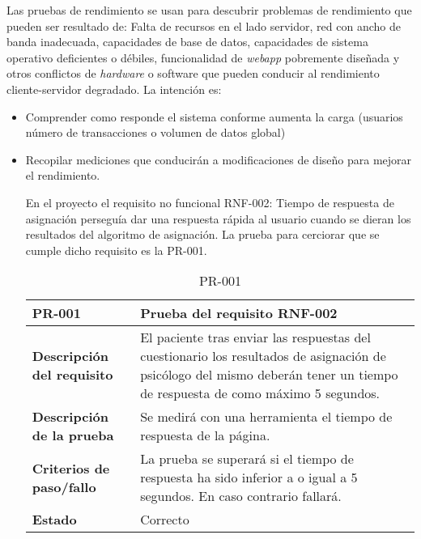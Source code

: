 Las pruebas de rendimiento se usan para descubrir problemas de rendimiento que pueden ser resultado de: Falta de recursos en el lado servidor, red con ancho de banda inadecuada, capacidades de base de datos, capacidades de sistema operativo deficientes o débiles, funcionalidad de \textit{webapp} pobremente diseñada y otros conflictos de \textit{hardware} o software que pueden conducir al rendimiento cliente-servidor degradado. La intención es: 


\begin{itemize}
\item Comprender como responde el sistema conforme aumenta la carga (usuarios número de transacciones o volumen de datos global) 
\item Recopilar mediciones que conducirán a modificaciones de diseño para mejorar el rendimiento.


En el proyecto el requisito no funcional RNF-002: Tiempo de respuesta de asignación perseguía dar una respuesta rápida al usuario cuando se dieran los resultados del algoritmo de asignación. La prueba para cerciorar que se cumple dicho requisito es la PR-001.


\begin{table}[htpb]
\centering
\begin{tabularx}{\textwidth}{|l|X|}
\hline
\textbf{PR-001}                     & \textbf{Prueba del requisito RNF-002}                                                                                                                                      \\ \hline
\textbf{Descripción del requisito} & El paciente tras enviar las respuestas del cuestionario los resultados de asignación de psicólogo del mismo deberán tener un tiempo de respuesta de como máximo 5 segundos. \\ \hline
\textbf{Descripción de la prueba}  & Se medirá con una herramienta el tiempo de respuesta de la página.                                                                                                         \\ \hline
\textbf{Criterios de paso/fallo}   & La prueba se superará si el tiempo de respuesta ha sido inferior a o igual a 5 segundos. En caso contrario fallará.                                                        \\ \hline
\textbf{Estado}                    & Correcto                                                                                                                                                                   \\ \hline
\end{tabularx}
\caption{PR-001}
\end{table}

\end{itemize}